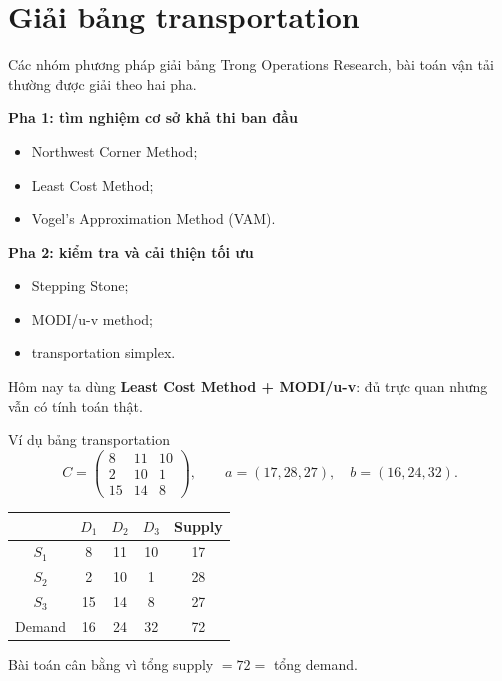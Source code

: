 \documentclass[10pt]{beamer}
\begin{document}
\section{Giải bảng transportation}

\begin{frame}{Các nhóm phương pháp giải bảng}
    Trong Operations Research, bài toán vận tải thường được giải theo hai pha.

    \vspace{0.15cm}
    \textbf{Pha 1: tìm nghiệm cơ sở khả thi ban đầu}
    \begin{itemize}
        \item Northwest Corner Method;
        \item Least Cost Method;
        \item Vogel's Approximation Method (VAM).
    \end{itemize}

    \textbf{Pha 2: kiểm tra và cải thiện tối ưu}
    \begin{itemize}
        \item Stepping Stone;
        \item MODI/u-v method;
        \item transportation simplex.
    \end{itemize}

    Hôm nay ta dùng \textbf{Least Cost Method + MODI/u-v}: đủ trực quan nhưng vẫn có tính toán thật.
\end{frame}

\begin{frame}{Ví dụ bảng transportation}
    \[
    C=
    \begin{pmatrix}
    8&11&10\\
    2&10&1\\
    15&14&8
    \end{pmatrix},
    \qquad
    a=(17,28,27),\quad b=(16,24,32).
    \]

    \begin{center}
    \begin{tabular}{c|ccc|c}
        \toprule
        & $D_1$ & $D_2$ & $D_3$ & Supply\\
        \midrule
        $S_1$ & 8 & 11 & 10 & 17\\
        $S_2$ & 2 & 10 & 1 & 28\\
        $S_3$ & 15 & 14 & 8 & 27\\
        \midrule
        Demand & 16 & 24 & 32 & 72\\
        \bottomrule
    \end{tabular}
    \end{center}

    Bài toán cân bằng vì tổng supply $=72=$ tổng demand.
\end{frame}
\end{document}
